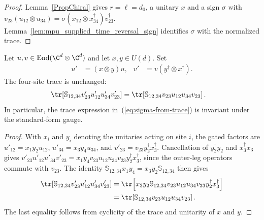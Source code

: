\begin{proof}\leanok
    Lemma~\ref{PropChiral} gives $r=\ell=d_0$, a unitary $x$ and a sign
    $\sigma$ with
    $v_{23}(u_{12}\otimes u_{34})=\sigma(x_{12}\otimes x_{34}^\dagger)v_{23}^\dagger$.
    Lemma~\ref{lem:mpu_supplied_time_reversal_sign} identifies $\sigma$ with
    the normalized trace.
\end{proof}

\begin{lemma}
    \label{lem:mpu_sigma_gauge_invariant}
    \leanok
    Let $u,v\in\operatorname{End}(\C^d\otimes\C^d)$ and let
    $x,y\in U(d)$. Set
    \begin{align}
        u' & =(x\otimes y)u,                 &
        v' & =v(y^\dagger\otimes x^\dagger).
    \end{align}
    The four-site trace is unchanged:
    \begin{align}
        \tr\!\left[\mathbb S_{12,34}v'_{23}u'_{12}u'_{34}v'_{23}\right]
         & =\tr\!\left[\mathbb S_{12,34}v_{23}u_{12}u_{34}v_{23}\right].
    \end{align}
    In particular, the trace expression in~(\ref{eq:sigma-from-trace}) is
    invariant under the standard-form gauge.
\end{lemma}

\begin{proof}\leanok
    With $x_i$ and $y_i$ denoting the unitaries acting on site $i$, the gated factors are
    $u'_{12}=x_1y_2u_{12}$, $u'_{34}=x_3y_4u_{34}$, and
    $v'_{23}=v_{23}y_2^\dagger x_3^\dagger$.
    Cancellation of $y_2^\dagger y_2$ and $x_3^\dagger x_3$ gives
    $v'_{23}u'_{12}u'_{34}v'_{23}
        =x_1y_4v_{23}u_{12}u_{34}v_{23}y_2^\dagger x_3^\dagger$,
    since the outer-leg operators commute with $v_{23}$. The identity
    $\mathbb S_{12,34}x_1y_4=x_3y_2\mathbb S_{12,34}$ then gives
    \begin{align}
        \tr\!\left[\mathbb S_{12,34}v'_{23}u'_{12}u'_{34}v'_{23}\right]
         & =\tr\!\left[x_3y_2\mathbb S_{12,34}
        v_{23}u_{12}u_{34}v_{23}y_2^\dagger x_3^\dagger\right]           \\
         & =\tr\!\left[\mathbb S_{12,34}v_{23}u_{12}u_{34}v_{23}\right].
    \end{align}
    The last equality follows from cyclicity of the trace and unitarity of
    $x$ and $y$.
\end{proof}

